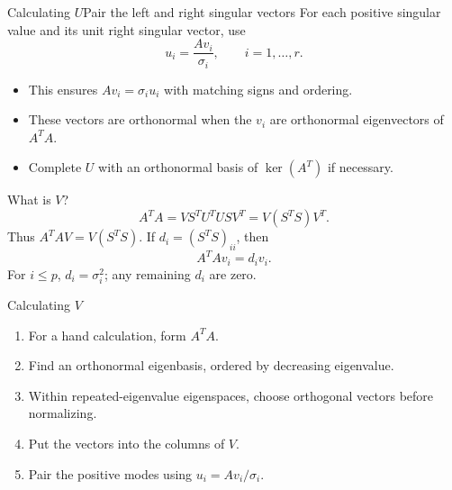 \documentclass[10pt]{beamer}
\begin{document}

\begin{frame}{Calculating \( U \)}{Pair the left and right singular vectors}
For each positive singular value and its unit right singular vector, use
\[
u_i=\frac{Av_i}{\sigma_i},\qquad i=1,\ldots,r.
\]
\begin{itemize}
\item This ensures $Av_i=\sigma_i u_i$ with matching signs and ordering.
\item These vectors are orthonormal when the $v_i$ are orthonormal eigenvectors of $A^TA$.
\item Complete $U$ with an orthonormal basis of $\ker(A^T)$ if necessary.
\end{itemize}
\end{frame}
\begin{frame}{What is $V$?}
\[
A^TA=VS^TU^TUSV^T=V(S^TS)V^T.
\]
Thus $A^TAV=V(S^TS)$. If $d_i=(S^TS)_{ii}$, then
\[
A^TAv_i=d_i v_i.
\]
For $i\le p$, $d_i=\sigma_i^2$; any remaining $d_i$ are zero.
\end{frame}

\begin{frame}{Calculating \( V \)}
\begin{enumerate}
\item For a hand calculation, form $A^TA$.
\item Find an orthonormal eigenbasis, ordered by decreasing eigenvalue.
\item Within repeated-eigenvalue eigenspaces, choose orthogonal vectors before normalizing.
\item Put the vectors into the columns of $V$.
\item Pair the positive modes using $u_i=Av_i/\sigma_i$.
\end{enumerate}
\end{frame}
\end{document}
